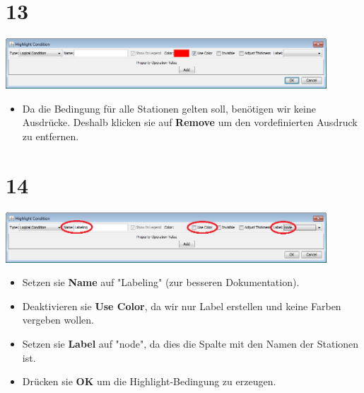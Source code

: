 \documentclass{beamer}
\begin{document}
\section{13}
\begin{frame}
	\begin{center}
  		\includegraphics[width=0.9\textwidth]{13.png}
	\end{center}
	\begin{itemize}
		\item Da die Bedingung für alle Stationen gelten soll, benötigen wir keine Ausdrücke. Deshalb klicken sie auf \textbf{Remove} um den vordefinierten Ausdruck zu entfernen.
	\end{itemize}
\end{frame}

\section{14}
\begin{frame}
	\begin{center}
  		\includegraphics[width=0.9\textwidth]{14.png}
	\end{center}
	\begin{itemize}
		\item Setzen sie \textbf{Name} auf "Labeling" (zur besseren Dokumentation).
		\item Deaktivieren sie \textbf{Use Color}, da wir nur Label erstellen und keine Farben vergeben wollen.
		\item Setzen sie \textbf{Label} auf "node", da dies die Spalte mit den Namen der Stationen ist.
		\item Drücken sie \textbf{OK} um die Highlight-Bedingung zu erzeugen.
	\end{itemize}
\end{frame}
\end{document}

